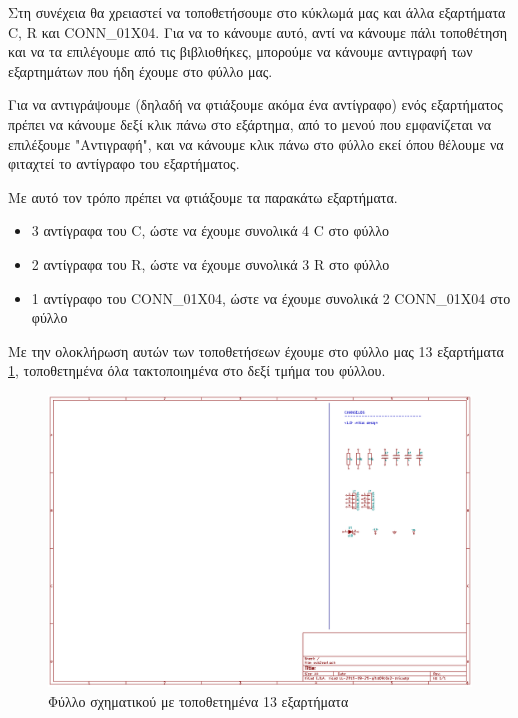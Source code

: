 \documentclass[a4paper]{article}
\begin{document}
Στη συνέχεια θα χρειαστεί να τοποθετήσουμε στο κύκλωμά μας και άλλα εξαρτήματα C, R και CONN\_01X04. Για να το κάνουμε αυτό, αντί να κάνουμε πάλι τοποθέτηση και να τα επιλέγουμε από τις βιβλιοθήκες, μπορούμε να κάνουμε αντιγραφή των εξαρτημάτων που ήδη έχουμε στο φύλλο μας. 

Για να αντιγράψουμε (δηλαδή να φτιάξουμε ακόμα ένα αντίγραφο) ενός εξαρτήματος πρέπει να κάνουμε δεξί κλικ πάνω στο εξάρτημα, από το μενού που εμφανίζεται να επιλέξουμε "Αντιγραφή", και να κάνουμε κλικ πάνω στο φύλλο εκεί όπου θέλουμε να φιταχτεί το αντίγραφο του εξαρτήματος. 

Με αυτό τον τρόπο πρέπει να φτιάξουμε τα παρακάτω εξαρτήματα.

\begin{itemize}
    \item 3 αντίγραφα του C, ώστε να έχουμε συνολικά 4 C στο φύλλο
    \item 2 αντίγραφα του R, ώστε να έχουμε συνολικά 3 R στο φύλλο
    \item 1 αντίγραφο του CONN\_01X04, ώστε να έχουμε συνολικά 2 CONN\_01X04 στο φύλλο
\end{itemize}

Με την ολοκλήρωση αυτών των τοποθετήσεων έχουμε στο φύλλο μας 13 εξαρτήματα \ref{fig:eesch-circ-placedccompcop}, τοποθετημένα όλα τακτοποιημένα στο δεξί τμήμα του φύλλου.

\begin{figure}
  \begin{center}
    \includegraphics[width=.9\textwidth]{img/eesch-circ-placedccompcop.png}
    \caption{Φύλλο σχηματικού με τοποθετημένα 13 εξαρτήματα}
    \label{fig:eesch-circ-placedccompcop}
  \end{center}
\end{figure}
\end{document}
